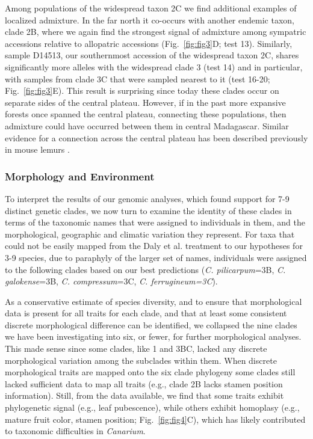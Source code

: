 \documentclass[10pt,letterpaper]{article}
\begin{document}
Among populations of the widespread taxon 2C we find additional examples of localized admixture. In the far north it co-occurs with another endemic taxon, clade 2B, where we again find the strongest signal of admixture among sympatric accessions relative to allopatric accessions (Fig.~\ref{fig:fig3}D; test 13). Similarly, sample D14513, our southernmost accession of the widespread taxon 2C, shares significantly more alleles with the widespread clade 3 (test 14) and in particular, with samples from clade 3C that were sampled nearest to it (test 16-20; Fig.~\ref{fig:fig3}E). This result is surprising since today these clades occur on separate sides of the central plateau. However, if in the past more expansive forests once spanned the central plateau, connecting these populations, then admixture could have occurred between them in central Madagascar. Similar evidence for a connection across the central plateau has been described previously in mouse lemurs \cite{yoder_geogenetic_2016}. 


\subsubsection*{Morphology and Environment} %
To interpret the results of our genomic analyses, which found support for 7-9 distinct genetic clades, we now turn to examine the identity of these clades in terms of the taxonomic names that were assigned to individuals in them, and the morphological, geographic and climatic variation they represent. For taxa that could not be easily mapped from the Daly et al. \cite{daly_revision_2015} treatment to our hypotheses for 3-9 species, due to paraphyly of the larger set of names, individuals were assigned to the following clades based on our best predictions (\emph{C. pilicarpum}=3B, \emph{C. galokense}=3B, \emph{C. compressum}=3C, \emph{C. ferrugineum=3C}). 

As a conservative estimate of species diversity, and to ensure that morphological data is present for all traits for each clade, and that at least some consistent discrete morphological difference can be identified, we collapsed the nine clades we have been investigating into six, or fewer, for further morphological analyses. This made sense since some clades, like 1 and 3BC, lacked any discrete morphological variation among the subclades within them. When discrete morphological traits are mapped onto the six clade phylogeny some clades still lacked sufficient data to map all traits (e.g., clade 2B lacks stamen position information). Still, from the data available, we find that some traits exhibit phylogenetic signal (e.g., leaf pubescence), while others exhibit homoplasy (e.g., mature fruit color, stamen position; Fig.~\ref{fig:fig4}C), which has likely contributed to taxonomic difficulties in \emph{Canarium}. 
\end{document}
